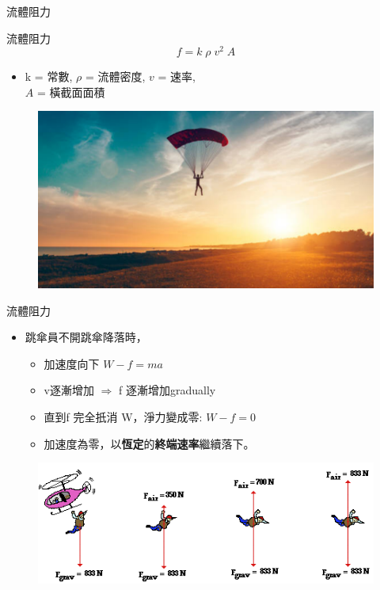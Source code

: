 \documentclass[beamer=true]{standalone}
\begin{document}
\begin{frame}{流體阻力}
    \begin{exampleblock}
        {流體阻力}
        \begin{equation}
            f=k \;\rho\; v^2\; A
        \end{equation}
    \end{exampleblock}
    \begin{itemize}
        \item k = 常數, $\rho$ = 流體密度, $v$ = 速率, \\$A$ = 橫截面面積

    \end{itemize}
    \bigskip
    \begin{figure}[h!]
        \centering
        \includegraphics[width=.4\textwidth]{assets/31e14542.png}
    \end{figure}
\end{frame}
\begin{frame}{流體阻力}
    \begin{itemize}
        \item 跳傘員不開跳傘降落時，
              \begin{itemize}
                  \item 加速度向下  $W-f=ma$
                  \item v逐漸增加 $\Rightarrow$ f 逐漸增加gradually
                  \item 直到f 完全扺消 W，淨力變成零:  $W-f=0$
                  \item 加速度為零，以\textbf{恆定}的\textbf{終端速率}繼續落下。
              \end{itemize}
    \end{itemize}
    \begin{figure}[h!]
        \centering
        \includegraphics[width=.7\textwidth]{assets/e052106e.png}
    \end{figure}
\end{frame}
\end{document}
